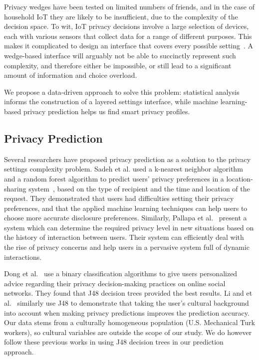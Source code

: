 Privacy wedges have been tested on limited numbers of friends, and in the case of household IoT they are likely to be insufficient, due to the complexity of the decision space. To wit, IoT privacy decisions involve a large selection of devices, each with various sensors that collect data for a range of different purposes. This makes it complicated to design an interface that covers every possible setting~\cite{williams2016perfect}. A wedge-based interface will arguably not be able to succinctly represent such complexity, and therefore either be impossible, or still lead to a significant amount of information and choice overload. 

We propose a data-driven approach to solve this problem: statistical analysis informs the construction of a layered settings interface, while machine learning-based privacy prediction helps us find smart privacy profiles.


\subsection{Privacy Prediction}
Several researchers have proposed privacy prediction as a solution to the privacy settings complexity problem. Sadeh et al. used a k-nearest neighbor algorithm and a random forest algorithm to predict users' privacy preferences in a location-sharing system~\cite{sadeh2009understanding}, based on the type of recipient and the time and location of the request. They demonstrated that users had difficulties setting their privacy preferences, and that the applied machine learning techniques can help users to choose more accurate disclosure preferences. Similarly, Pallapa et al.~\cite{pallapa2014adaptive} present a system which can determine the required privacy level in new situations based on the history of interaction between users. Their system can efficiently deal with the rise of privacy concerns and help users in a pervasive system full of dynamic interactions.

Dong et al.~\cite{dong2016ppm} use a binary classification algorithms to give users personalized advice regarding their privacy decision-making practices on online social networks. They found that J48 decision trees provided the best results. Li and et al.~\cite{li2017cross} similarly use J48 to demonstrate that taking the user's cultural background into account when making privacy predictions improves the prediction accuracy. Our data stems from a culturally homogeneous population (U.S. Mechanical Turk workers), so cultural variables are outside the scope of our study. We do however follow these previous works in using J48 decision trees in our prediction approach.

